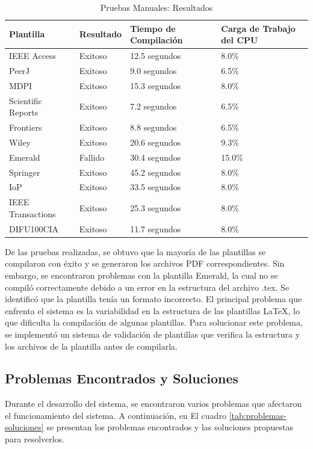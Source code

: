 \begin{table}[H]
    \centering
    \begin{tabular}{|p{5cm}|p{3cm}|p{4cm}|p{2cm}|}
        \hline
        \textbf{Plantilla} & \textbf{Resultado} & \textbf{Tiempo de Compilación} & \textbf{Carga de Trabajo del CPU} \\
        \hline
        IEEE Access & Exitoso & 12.5 segundos & 8.0\% \\
        PeerJ & Exitoso & 9.0 segundos & 6.5\% \\
        MDPI & Exitoso & 15.3 segundos & 8.0\% \\
        Scientific Reports & Exitoso & 7.2 segundos & 6.5\% \\
        Frontiers & Exitoso & 8.8 segundos & 6.5\% \\
        Wiley & Exitoso & 20.6 segundos & 9.3\% \\
        Emerald & Fallido & 30.4 segundos & 15.0\% \\
        Springer & Exitoso & 45.2 segundos & 8.0\% \\
        IoP & Exitoso & 33.5 segundos & 8.0\% \\
        IEEE Transactions & Exitoso & 25.3 segundos & 8.0\% \\
        DIFU100CIA & Exitoso & 11.7 segundos & 8.0\% \\
        \hline
    \end{tabular}
    \caption{Pruebas Manuales: Resultados}
    \label{tab:pruebas-manuales}
\end{table}

De las pruebas realizadas, se obtuvo que la mayoría de las plantillas se compilaron con éxito y se generaron los archivos PDF correspondientes. Sin embargo, se encontraron problemas con la plantilla Emerald, la cual no se compiló correctamente debido a un error en la estructura del archivo .tex. Se identificó que la plantilla tenía un formato incorrecto. El principal problema que enfrenta el sistema es la variabilidad en la estructura de las plantillas LaTeX, lo que dificulta la compilación de algunas plantillas. Para solucionar este problema, se implementó un sistema de validación de plantillas que verifica la estructura y los archivos de la plantilla antes de compilarla. 

\subsection{Problemas Encontrados y Soluciones}
Durante el desarrollo del sistema, se encontraron varios problemas que afectaron el funcionamiento del sistema. A continuación, en El cuadro \ref{tab:problemas-soluciones} se presentan los problemas encontrados y las soluciones propuestas para resolverlos.

